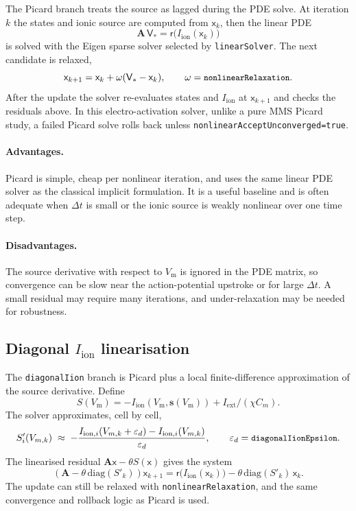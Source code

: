 \documentclass[11pt,a4paper]{article}
\newcommand{\code}[1]{\texttt{\small #1}}
\newcommand{\Vm}{V_{\text{m}}}
\newcommand{\Iion}{I_{\mathrm{ion}}}
\newcommand{\Aimp}{\mathbf{A}}
\newcommand{\Iext}{I_{\mathrm{ext}}}
\begin{document}
The Picard branch treats the source as lagged during the PDE solve. At
iteration $k$ the states and ionic source are computed from
$\mathsf{x}_k$, then the linear PDE
\begin{equation}
  \Aimp\,\mathsf{V}_{*}
  =
  \mathsf{r}\!\bigl(\Iion(\mathsf{x}_{k})\bigr)
\end{equation}
is solved with the Eigen sparse solver selected by \code{linearSolver}.
The next candidate is relaxed,
\begin{equation}
  \mathsf{x}_{k+1}
  =
  \mathsf{x}_{k}
  + \omega(\mathsf{V}_{*}-\mathsf{x}_{k}),
  \qquad
  \omega=\code{nonlinearRelaxation}.
\end{equation}
After the update the solver re-evaluates states and $\Iion$ at
$\mathsf{x}_{k+1}$ and checks the residuals above. In this
electro-activation solver, unlike a pure MMS Picard study, a failed
Picard solve rolls back unless \code{nonlinearAcceptUnconverged=true}.

\paragraph{Advantages.}
Picard is simple, cheap per nonlinear iteration, and uses the same
linear PDE solver as the classical implicit formulation. It is a useful
baseline and is often adequate when $\Delta t$ is small or the ionic
source is weakly nonlinear over one time step.

\paragraph{Disadvantages.}
The source derivative with respect to $\Vm$ is ignored in the PDE
matrix, so convergence can be slow near the action-potential upstroke or
for large $\Delta t$. A small residual may require many iterations, and
under-relaxation may be needed for robustness.

\subsection{Diagonal \texorpdfstring{$\Iion$}{Iion} linearisation}

The \code{diagonalIion} branch is Picard plus a local finite-difference
approximation of the source derivative. Define
\[
  S(\Vm) = -\Iion(\Vm,\mathbf{s}(\Vm)) + \Iext/(\chi C_m).
\]
The solver approximates, cell by cell,
\begin{equation}
  S'_i(V_{m,k})
  \;\approx\;
  -\frac{
      I_{\mathrm{ion},i}(V_{m,k}+\varepsilon_d)
      - I_{\mathrm{ion},i}(V_{m,k})
    }{\varepsilon_d},
  \qquad
  \varepsilon_d=\code{diagonalIionEpsilon}.
\end{equation}
The linearised residual
$\Aimp\mathsf{x}-\theta S(\mathsf{x})$ gives the system
\begin{equation}
  \left(\Aimp-\theta\,\mathrm{diag}(S'_k)\right)\mathsf{x}_{k+1}
  =
  \mathsf{r}\!\bigl(\Iion(\mathsf{x}_{k})\bigr)
  - \theta\,\mathrm{diag}(S'_k)\,\mathsf{x}_{k}.
  \label{eq:diagonalIion}
\end{equation}
The update can still be relaxed with \code{nonlinearRelaxation}, and
the same convergence and rollback logic as Picard is used.
\end{document}
